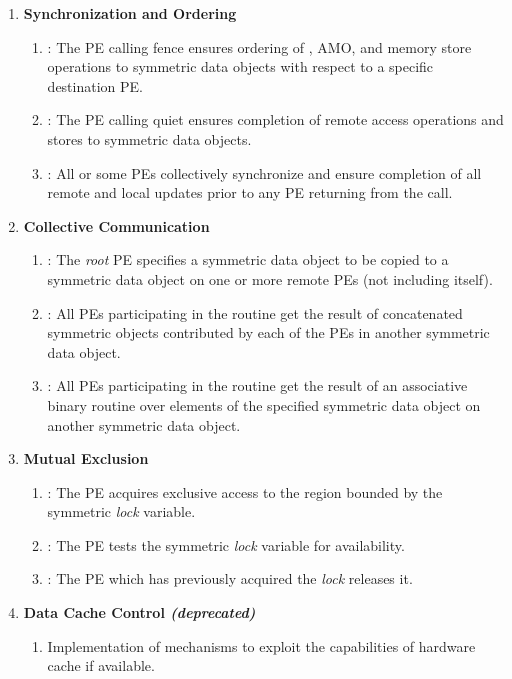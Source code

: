 \begin{enumerate}
\item \textbf{Synchronization and Ordering}
\begin{enumerate}
  \item {}:  The \ac{PE} calling fence ensures ordering of   
  \PUT, AMO, and memory store operations
  to symmetric data objects with respect to a specific
      destination \ac{PE}. 
  \item {}:  The \ac{PE} calling quiet ensures completion of remote access
      operations and stores to symmetric data objects. 
  \item {}:  All or some \acp{PE} collectively synchronize and ensure
      completion of all remote and local updates prior to any \ac{PE} returning
      from the call.
\end{enumerate}

\item \textbf{Collective Communication}
\begin{enumerate}
  \item {}:  The \textit{root} \ac{PE} specifies a symmetric data
      object to be copied to a symmetric data object on one or more remote
      \acp{PE} (not including itself). 
  \item {}:  All \acp{PE} participating in the routine get the result
      of concatenated symmetric objects contributed by each of the \acp{PE} in
      another symmetric data object.
  \item {}:  All \acp{PE} participating in the routine get the result
      of an associative binary routine over elements of the specified symmetric
      data object on another symmetric data object. 
\end{enumerate}

\item \textbf{Mutual Exclusion}
\begin{enumerate}
  \item {}: The \ac{PE} acquires exclusive access to the region
      bounded by the symmetric \textit{lock} variable.
  \item {}: The \ac{PE} tests the symmetric \textit{lock} variable
      for availability.
  \item {}: The \ac{PE} which has previously acquired the
      \textit{lock} releases it.
\end{enumerate}

\item \textbf{Data Cache Control \textit{(deprecated)}}
\begin{enumerate}
  \item Implementation of mechanisms to exploit the capabilities of hardware cache
      if available.
\end{enumerate}
\end{enumerate}
